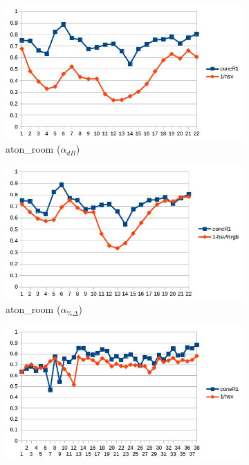 \documentclass[12pt]{report}
\begin{document}
\begin{figure}
\centering
\begin{subfigure}{.49\linewidth}
  \includegraphics[width=1\linewidth]{figures/correlations/db/room_hsv.jpg}
  \caption{aton\_room ($\alpha_{dB}$)}
\end{subfigure}
\hfill
\begin{subfigure}{.49\linewidth}
  \includegraphics[width=1\linewidth]{figures/correlations/rgb/room_hsv.jpg}
  \caption{aton\_room ($\alpha_{\%\Delta}$)}
\end{subfigure}
\hfill
\begin{subfigure}{.49\linewidth}
  \includegraphics[width=1\linewidth]{figures/correlations/db/campus_hsv.jpg}

\end{subfigure}
\end{figure}
\end{document}
